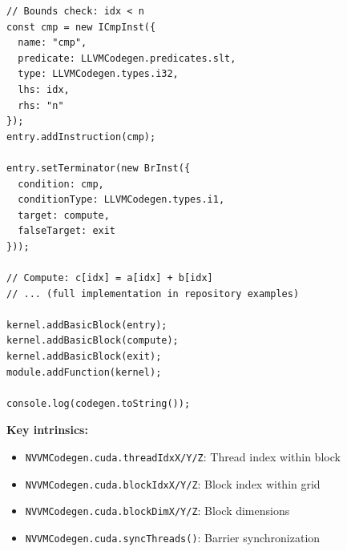 \begin{lstlisting}[style=ts]
// Bounds check: idx < n
const cmp = new ICmpInst({
  name: "cmp",
  predicate: LLVMCodegen.predicates.slt,
  type: LLVMCodegen.types.i32,
  lhs: idx,
  rhs: "n"
});
entry.addInstruction(cmp);

entry.setTerminator(new BrInst({
  condition: cmp,
  conditionType: LLVMCodegen.types.i1,
  target: compute,
  falseTarget: exit
}));

// Compute: c[idx] = a[idx] + b[idx]
// ... (full implementation in repository examples)

kernel.addBasicBlock(entry);
kernel.addBasicBlock(compute);
kernel.addBasicBlock(exit);
module.addFunction(kernel);

console.log(codegen.toString());
\end{lstlisting}

\textbf{Key  intrinsics:}
\begin{itemize}[noitemsep]
  \item \texttt{NVVMCodegen.cuda.threadIdxX/Y/Z}: Thread index within block
  \item \texttt{NVVMCodegen.cuda.blockIdxX/Y/Z}: Block index within grid
  \item \texttt{NVVMCodegen.cuda.blockDimX/Y/Z}: Block dimensions
  \item \texttt{NVVMCodegen.cuda.syncThreads()}: Barrier synchronization
\end{itemize}

